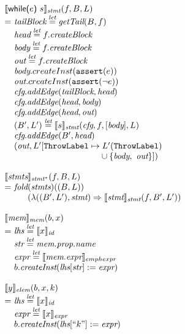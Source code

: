 \[
\begin{array}{l@{}l@{~}l}
\lefteqn{\transfun{\ircfgwhile{e}{s}}_{\emph{stmt}}(f, B, L)}\\
& = & \emph{tailBlock} \letval \getTail(B, f)\\
& & \emph{head} \letval f.\emph{createBlock}\\
& & \emph{body} \letval f.\emph{createBlock}\\
& & \emph{out} \letval f.\emph{createBlock}\\
& & \emph{body}.createInst(\TT{assert}(e))\\
& & \emph{out}.createInst(\TT{assert}(\neg e))\\
& & \emph{cfg}.\emph{addEdge}(\emph{tailBlock}, \emph{head})\\
& & \emph{cfg}.\emph{addEdge}(\emph{head}, \emph{body})\\
& & \emph{cfg}.\emph{addEdge}(\emph{head}, \emph{out})\\
& & (B', L') \letval \transfun{s}_{\emph{stmt}}(\emph{cfg}, f, [\emph{body}], L)\\
& & \emph{cfg}.\emph{addEdge}(B', \emph{head})\\
& & (\emph{out}, L'[\ThrowLabel \mapsto L'(\ThrowLabel)\\
& & \phantom{(\emph{out}, L'[\ThrowLabel \mapsto}
 \cup \{ \emph{body},\ \emph{out} \}]) \\
& & \\

\lefteqn{\transfun{\emph{stmts}}_{\emph{stmt}^{*}}(f, B, L)}\\
& = & \fold(\emph{stmts})((B, L))\\
& & \phantom{\fold}(\lambda((B', L'), \emph{stmt}) \Rightarrow \transfun{\emph{stmt}}_{\emph{stmt}}(f, B', L'))\\
& & \\

\lefteqn{\transfun{\emph{mem}}_{\emph{mem}}(b, x)}\\
& = & \emph{lhs} \letval \transfun{x}_{\emph{id}}\\
& & \emph{str} \letval \emph{mem}.\emph{prop}.\emph{name}\\
& & \emph{expr} \letval \transfun{\emph{mem}.\emph{expr}}_{emph{expr}}\\
& & b.\emph{createInst}(\emph{lhs}[\emph{str}] := \emph{expr})\\
& & \\

\lefteqn{\transfun{y}_{\emph{elem}}(b, x, k)}\\
& = & \emph{lhs} \letval \transfun{x}_{\emph{id}}\\
& & \emph{expr} \letval \transfun{x}_{\emph{expr}}\\
& & b.\emph{createInst}(\emph{lhs} [``k"] := \emph{expr})\\
& & \\


\end{array}\]
